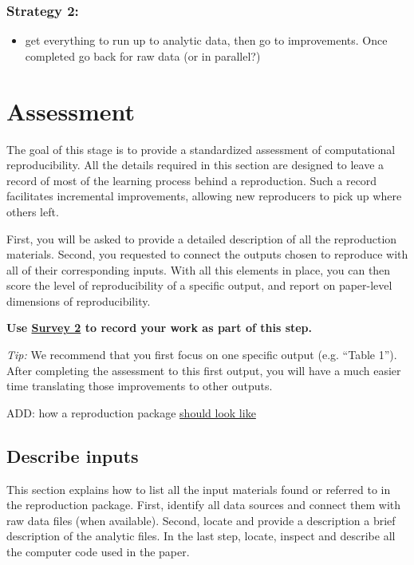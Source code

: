 \documentclass[]{book}
\providecommand{\tightlist}{%
  \setlength{\itemsep}{0pt}\setlength{\parskip}{0pt}}
\begin{document}
\hypertarget{strategy-2}{%
\subsection{Strategy 2:}\label{strategy-2}}

\begin{itemize}
\tightlist
\item
  get everything to run up to analytic data, then go to improvements. Once completed go back for raw data (or in parallel?)
\end{itemize}

\hypertarget{assessment}{%
\chapter{Assessment}\label{assessment}}

The goal of this stage is to provide a standardized assessment of computational reproducibility. All the details required in this section are designed to leave a record of most of the learning process behind a reproduction. Such a record facilitates incremental improvements, allowing new reproducers to pick up where others left.

First, you will be asked to provide a detailed description of all the reproduction materials. Second, you requested to connect the outputs chosen to reproduce with all of their corresponding inputs. With all this elements in place, you can then score the level of reproducibility of a specific output, and report on paper-level dimensions of reproducibility.

\textbf{Use \href{https://berkeley.qualtrics.com/jfe/form/SV_2gd9Y3XVtjLpZL7}{Survey 2} to record your work as part of this step.}

\emph{Tip: }We recommend that you first focus on one specific output (e.g. ``Table 1''). After completing the assessment to this first output, you will have a much easier time translating those improvements to other outputs.

ADD: how a reproduction package \href{https://social-science-data-editors.github.io/guidance/Verification_guidance.html.}{should look like}

\hypertarget{describe-inputs}{%
\section{Describe inputs}\label{describe-inputs}}

This section explains how to list all the input materials found or referred to in the reproduction package. First, identify all data sources and connect them with raw data files (when available). Second, locate and provide a description a brief description of the analytic files. In the last step, locate, inspect and describe all the computer code used in the paper.
\end{document}

